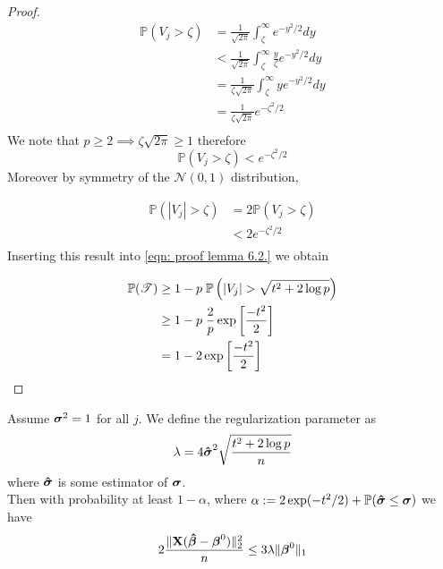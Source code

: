 \begin{proof}
    \begin{align*}
        \mathbb{P}(V_j > \zeta) & = \frac{1}{\sqrt{2\pi}} \int_\zeta^{\infty} e^{-y^2/2} dy                   \\
                                & < \frac{1}{\sqrt{2\pi}} \int_\zeta^{\infty} \frac{y}{\zeta} e^{-y^2 / 2} dy \\
                                & = \frac{1}{\zeta \sqrt{2\pi}} \int_\zeta^{\infty} y e^{-y^2 / 2} dy         \\
                                & = \frac{1}{\zeta\sqrt{2\pi}} e^{-\zeta^2/2}                                 \\
    \end{align*}
    We note that $p \geq 2 \implies \zeta \sqrt{2 \pi} \geq 1$ therefore
    $$
        \mathbb{P}(V_j > \zeta) <  e^{-\zeta^2/2}
    $$
    Moreover by symmetry of the $\mathscr{N} (0,1)$ distribution,

    \begin{align*}
        \mathbb{P} (|V_j| > \zeta) & = 2 \mathbb{P} (V_j > \zeta) \\
                                   & < 2 e^{-\zeta^2/2}           \\
    \end{align*}
    Inserting this result into \eqref{eqn: proof lemma 6.2.} we obtain

    \begin{align*}
        \mathbb{P}(\mathscr{T}) & \geq 1 - p \; \P \left( | V_{j} | > \sqrt{t^{2}+2 \log p}  \right) \\
                                & \geq 1 - p \; \frac{2}{p} \exp \left[ \frac{- t^{2}}{2} \right]    \\
                                & = 1 - 2 \exp \left[ \frac{- t^{2}}{2} \right]                      \\
    \end{align*}
\end{proof}

\begin{corollary}
    Assume $\sgm^2 = 1$ for all $j$. We define the regularization parameter as
    $$\lambda = 4 \sgmhat^2 \sqrt{\frac{t^2 + 2 \log p}{n}}$$
    where $\sgmhat$ is some estimator of $\sgm$. \\
    Then with probability at least $1 - \alpha$, where $\alpha := 2 \exp(-t^2/2) + \P (\sgmhat \leq \sgm)$ we have
    $$2 \frac{\| \X (\btahat - \bta^0)\|_2^2}{n} \leq 3 \lambda \| \bta^0 \|_1$$
\end{corollary}

